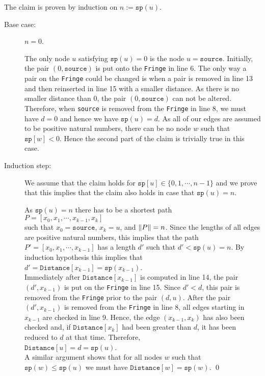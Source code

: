 \proof The claim is proven by induction on $n := \texttt{sp}(u)$.
\begin{description}
\item[Base case:] $n = 0$.

  The only node $u$ satisfying $\texttt{sp}(u) = 0$ is the node $u = \texttt{source}$.
  Initially, the pair $(0, \texttt{source})$ is put onto the \texttt{Fringe} in line 6.
  The only way a pair on the \texttt{Fringe} could be changed is when a pair is removed in line 13 and then
  reinserted in line 15 with a smaller distance.  As there is no smaller distance than $0$, the pair
  $(0, \texttt{source})$ can not be altered.  Therefore, when \texttt{source} is removed from the
  \texttt{Fringe} in line 8, we must have $d = 0$ and hence we have $\texttt{sp}(u) = d$.
  As all of our edges are assumed to be positive natural numbers, there can be no node $w$ such that
  $\texttt{sp}[w] < 0$. Hence the second part of the claim is trivially true in this case.
\item[Induction step:]  We assume that the claim holds for $\mathtt{sp}[u] \in \{0,1,\cdots,n-1\}$
  and we prove that this implies that the claim also holds in case that $\texttt{sp}(u) = n$.

  As $\texttt{sp}(u) = n$ there has to be a shortest path
  \\[0.2cm]
  \hspace*{1.3cm}
  $P = [x_0, x_1, \cdots, x_{k-1}, x_k]$
  \\[0.2cm]
  such that $x_0 = \texttt{source}$, $x_k = u$, and $\|P\| = n$.  Since the lengths of all edges are
  positive natural numbers, this implies that the path $P' = [x_0,x_1, \cdots, x_{k-1}]$ has a length $d'$ such
  that $d' < \texttt{sp}(u) = n$.  By induction hypothesis this implies that
  \\[0.2cm]
  \hspace*{1.3cm}
  $d' = \texttt{Distance}[x_{k-1}] = \texttt{sp}(x_{k-1})$.
  \\[0.2cm]
  Immediately after $\texttt{Distance}[x_{k-1}]$ is computed in line 14, the pair
  $(d', x_{k-1})$ is put on the \texttt{Fringe} in line 15.  Since $d' < d$, this pair is removed from the
  \texttt{Fringe} prior to the pair $(d, u)$.  After the pair $(d',x_{k-1})$ is removed from the
  \texttt{Fringe} in line 8, all edges starting in $x_{k-1}$ are checked in line 9.
  Hence, the edge $(x_{k-1}, x_k)$ has also been checked and, if $\texttt{Distance}[x_k]$ had been greater than
  $d$, it has been reduced to $d$ at that time.  Therefore,
  \\[0.2cm]
  \hspace*{1.3cm}
  $\texttt{Distance}[u] = d = \texttt{sp}(u)$.
  \\[0.2cm]
  A similar argument shows that for all nodes $w$ such that  
  $\texttt{sp}(w) \leq \texttt{sp}(u)$ we must have $\texttt{Distance}[w] = \texttt{sp}(w)$.  \qed
\end{description}

